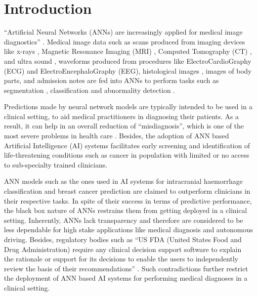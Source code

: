 \documentclass[../report.tex]{subfiles}
\begin{document}
    \chapter{Introduction}\label{ch_intro}
	 \enquote {Artificial Neural Networks (ANNs) are increasingly applied for medical image diagnostics} \cite{anwar2018medical}. Medical image data such as scans produced from imaging devices like x-rays \cite{ozturk2020automated}, Magnetic Resonance Imaging (MRI) \cite{xue2012window}, Computed Tomography (CT) \cite{lee2019explainable}, and ultra sound \cite{qian2021prospective}, waveforms produced from procedures like ElectroCardioGraphy (ECG) \cite{hicks2021explaining} and ElectroEncephaloGraphy (EEG), histological images \cite{binder2021morphological}, images of body parts, and admission notes \cite{li2017convolutional} are fed into ANNs to perform tasks such as segmentation \cite{Schwendicke2019}, classification \cite{Gurovich2019} and abnormality detection \cite{binder2021morphological}.
	
	Predictions made by neural network models are typically intended to be used in a clinical setting, to aid medical practitioners in diagnosing their patients. As a result, it can help in an overall reduction of \enquote{misdiagnosis}, which is one of the most severe problems in health care \cite{li2017convolutional}. Besides, the adoption of ANN based Artificial Intelligence (AI) systems facilitates early screening and identification of life-threatening conditions such as cancer in population with limited or no access to sub-specialty trained clinicians.
	
	ANN models such as the ones used in AI systems for intracranial haemorrhage classification \cite{lee2019explainable} and breast cancer prediction  \cite{mckinney2020international} are claimed to outperform clinicians in their respective tasks. In spite of their success in terms of predictive performance, the black box nature of ANNs restrains them from getting deployed in a clinical setting. Inherently, ANNs lack transparency and therefore are considered to be less dependable for high stake applications like medical diagnosis and autonomous driving. Besides, regulatory bodies such as \enquote{US FDA (United States Food and Drug Administration) require any clinical decision support software to explain the rationale or support for its decisions to enable the users to independently review the basis of their recommendations} \cite{lee2019explainable}. Such contradictions further restrict the deployment of ANN based AI systems for performing medical diagnoses in a clinical setting.
	
\end{document}
